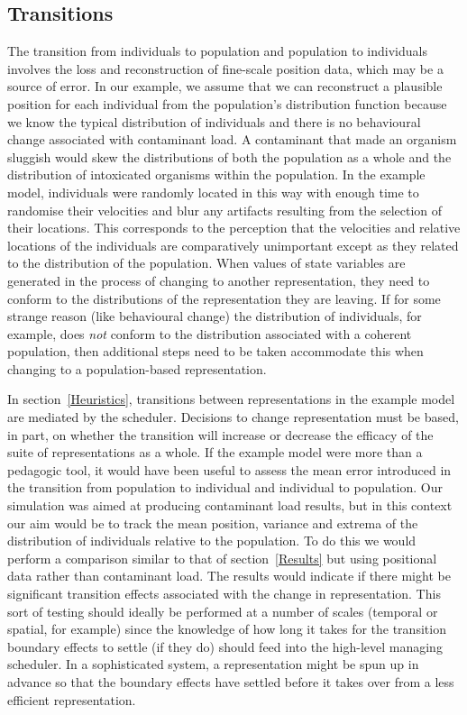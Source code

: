 \subsection{Transitions}

The transition from individuals to population and population to individuals
involves the loss and reconstruction of fine-scale position data, which may be
a source of error. In our example, we assume that we can reconstruct a
plausible position for each individual from the population's distribution
function because we know the typical distribution of individuals and there is
no behavioural change associated with contaminant load. A contaminant that
made an organism sluggish would skew the distributions of both the population
as a whole and the distribution of intoxicated organisms within the
population. In the example model, individuals were randomly located in this
way with enough time to randomise their velocities and blur any artifacts
resulting from the selection of their locations. This corresponds to the
perception that the velocities and relative locations of the individuals are
comparatively unimportant except as they related to the distribution of the
population. When values of state variables are generated in the process of
changing to another representation, they need to conform to the distributions
of the representation they are leaving. If for some strange reason (like
behavioural change) the distribution of individuals, for example, does
{\em{not}\/} conform to the distribution associated with a coherent
population, then additional steps need to be taken accommodate this when
changing to a population-based representation.

In section~\ref{Heuristics}, transitions between representations in the
example model are mediated by the scheduler. Decisions to change
representation must be based, in part, on whether the transition will increase
or decrease the efficacy of the suite of representations as a whole. If the
example model were more than a pedagogic tool, it would have been useful to
assess the mean error introduced in the transition from population to
individual and individual to population. Our simulation was aimed at producing
contaminant load results, but in this context our aim would be to track the
mean position, variance and extrema of the distribution of individuals
relative to the population. To do this we would perform a comparison similar
to that of section~\ref{Results} but using positional data rather than
contaminant load. The results would indicate if there might be significant
transition effects associated with the change in representation. This sort of
testing should ideally be performed at a number of scales (temporal or
spatial, for example) since the knowledge of how long it takes for the
transition boundary effects to settle (if they do) should feed into the
high-level managing scheduler. In a sophisticated system, a representation
might be spun up in advance so that the boundary effects have settled before
it takes over from a less efficient representation.

